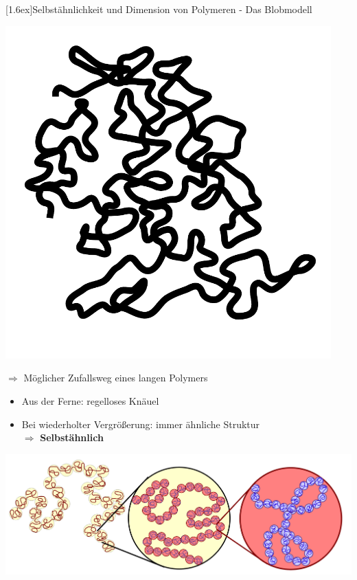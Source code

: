 \documentclass[final]{beamer}
\newlength{\columnheight}
\newlength{\marginw}
\newlength{\tw}
\newlength{\colw}
\newenvironment{myTwoColPoster}{%
  \begin{minipage}[t]{\textwidth}%
    \hspace*{\marginw}%
    \hspace*{9.5bp}%
    \begin{minipage}[t]{\tw}}%
  {\end{minipage}%
   \hspace*{\marginw}%
   \end{minipage}}
\newenvironment{myCol}%
    {\begin{minipage}[t][\columnheight][t]{\colw}}%
    {\end{minipage}}
\newenvironment{textblock}[1]%
    {\begin{block}{\rule[-0.6ex]{0pt}{2.4ex}\raisebox{-0.25ex}[1.6ex]{#1}}%
     \vspace*{5mm}}%
    {\vspace*{5mm}\end{block}}
\begin{document}
\begin{frame}[t]{}
\begin{myTwoColPoster}
\begin{myCol}
\begin{textblock}{Selbst\"ahnlichkeit und Dimension von Polymeren - Das Blobmodell}
\begin{center}
\begin{minipage}[c]{0.2\textwidth}
        \includegraphics[width=0.94\textwidth]{fig/RW}
      \end{minipage}\hfill
      \begin{minipage}[c]{0.75\textwidth}
        {\Large $\Longrightarrow$ M\"oglicher Zufallsweg eines langen Polymers}\hspace*{1cm}\vspace*{0.5cm}
        \begin{itemize} \setlength\itemsep{1.1em} \Large
          \item Aus der Ferne: regelloses Kn\"auel
          \item Bei wiederholter Vergrößerung: immer ähnliche Struktur\\[1.2em]
          \textcolor{IPForange}{$\Rightarrow$ \textbf{Selbstähnlich}}
        \end{itemize}
      \end{minipage}
    \end{center}\vspace*{0.8cm}
    \includegraphics[width=1.05\textwidth]{fig/blob_chain}\vspace*{0.8cm}


\end{textblock}
\end{myCol}
\end{myTwoColPoster}
\end{frame}
\end{document}

